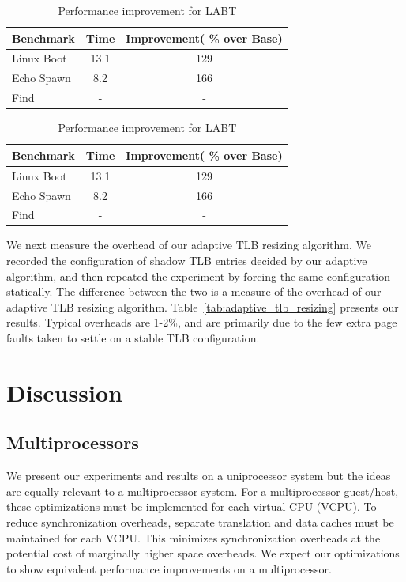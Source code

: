 \documentclass[10pt,twocolumn]{article}
\begin{document}
\begin{table}[!b]
\centering
\caption{Performance improvement for LABT}
     \begin{tabular}{lcc} \hline
       Benchmark  & Time & Improvement( \% over Base)  \\ \hline
       Linux Boot & 13.1 & 129  \\
       Echo Spawn & 8.2 & 166  \\
       Find & - & -  \\
       \hline
     \end{tabular}
\label{tab:ExpWithout1}
\end{table}

\begin{table}[!b]
\centering
\caption{Performance improvement for LABT}
     \begin{tabular}{lcc} \hline
       Benchmark  & Time & Improvement( \% over Base)  \\ \hline
       Linux Boot & 13.1 & 129  \\
       Echo Spawn & 8.2 & 166  \\
       Find & - & -  \\
       \hline
     \end{tabular}
\label{tab:ExpWithout2}
\end{table}

We next measure the overhead of our adaptive TLB resizing algorithm. We recorded
the configuration of shadow TLB entries decided by our adaptive algorithm, and
then repeated the experiment by forcing the same configuration statically. The
difference between the two is a measure of the overhead of our adaptive TLB
resizing algorithm. Table~\ref{tab:adaptive_tlb_resizing} presents our results.
Typical overheads are 1-2\%, and are primarily due to the few extra page faults
taken to settle on a stable TLB configuration.

\section{Discussion}
\subsection{Multiprocessors}
We present our experiments and results on a uniprocessor system but the
ideas are equally relevant to a multiprocessor system. For a multiprocessor
guest/host, these optimizations must be implemented for each virtual CPU (VCPU).
To reduce synchronization
overheads, separate translation and data caches must be maintained for each VCPU.
This minimizes synchronization overheads at the potential cost of marginally higher
space overheads. We expect
our optimizations to show equivalent performance improvements on a multiprocessor.
\end{document}
